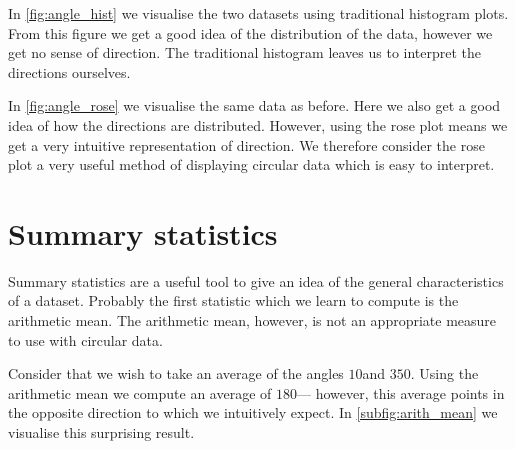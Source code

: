 In \cref{fig:angle_hist} we visualise the two datasets using traditional histogram plots. From this 
figure we get a good idea of the distribution of the data, however we get no sense of direction. The 
traditional histogram leaves us to interpret the directions ourselves.

In \cref{fig:angle_rose} we visualise the same data as before. Here we also get a good idea of how 
the directions are distributed. However, using the rose plot means we get a very intuitive 
representation of direction. We therefore consider the rose plot a very useful method of displaying 
circular data which is easy to interpret.

\section{Summary statistics}
\label{sec:summary_stats}

Summary statistics are a useful tool to give an idea of the general characteristics of a dataset. 
Probably the first statistic which we learn to compute is the arithmetic mean. The arithmetic mean, 
however, is not an appropriate measure to use with circular data.

Consider that we wish to take an average of the angles $10$\textdegree and $350$\textdegree. Using 
the arithmetic mean we compute an average of $180$\textdegree --- however, this average points in the 
opposite direction to which we intuitively expect. In \cref{subfig:arith_mean} we visualise this 
surprising result.


